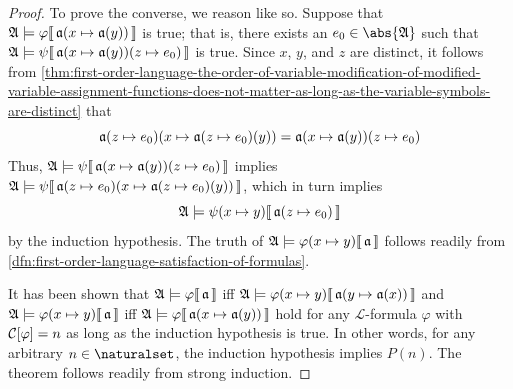 \begin{proof}
    \vspace{0.3cm}
    \noindent
    To prove the converse, we reason like so.
    Suppose that
    \( \folwffsatisfaction{\mathfrak{A}}{\varphi}{ \folmodifiedvariableassignmentfunction{\mathfrak{a}}{x}{\mathfrak{a}(y)} } \) is true; that is,
    there exists an \( e_{0} \in \abs{\mathfrak{A}} \) such that
    \(
        \folwffsatisfaction{\mathfrak{A}}{\psi}{ \folmodifiedvariableassignmentfunction{ \folmodifiedvariableassignmentfunction{\mathfrak{a}}{x}{\mathfrak{a}(y)} }{z}{e_{0}} }
    \) is true.
    Since \( x \), \( y \), and \( z \) are distinct, it follows from
    \cref{thm:first-order-language-the-order-of-variable-modification-of-modified-variable-assignment-functions-does-not-matter-as-long-as-the-variable-symbols-are-distinct} that
    \begin{equation*}
        \folmodifiedvariableassignmentfunction{ \folmodifiedvariableassignmentfunction{\mathfrak{a}}{z}{e_{0}} }{x}{ \folmodifiedvariableassignmentfunction{\mathfrak{a}}{z}{e_{0}}(y) } =
        \folmodifiedvariableassignmentfunction{ \folmodifiedvariableassignmentfunction{\mathfrak{a}}{x}{\mathfrak{a}(y)} }{z}{e_{0}}
    \end{equation*}
    Thus, \(\folwffsatisfaction{\mathfrak{A}}{\psi}{ \folmodifiedvariableassignmentfunction{ \folmodifiedvariableassignmentfunction{\mathfrak{a}}{x}{\mathfrak{a}(y)} }{z}{e_{0}} }\) implies
    \( \folwffsatisfaction{\mathfrak{A}}{\psi}{ \folmodifiedvariableassignmentfunction{ \folmodifiedvariableassignmentfunction{\mathfrak{a}}{z}{e_{0}} }{x}{ \folmodifiedvariableassignmentfunction{\mathfrak{a}}{z}{e_{0}}(y) } } \), which in turn implies
    \begin{equation*}
        \folwffsatisfaction{\mathfrak{A}}{ \folfreevariablereplacement{\psi}{x}{y} }{ \folmodifiedvariableassignmentfunction{\mathfrak{a}}{z}{e_{0}} }
    \end{equation*}
    by the induction hypothesis.
    The truth of \( \folwffsatisfaction{\mathfrak{A}}{ \folfreevariablereplacement{\varphi}{x}{y} }{ \mathfrak{a} } \) follows readily from \cref{dfn:first-order-language-satisfaction-of-formulas}.

    \vspace{0.3cm}
    \noindent
    It has been shown that \(  \mathfrak{A} \models \varphi\llbracket\, \mathfrak{a} \,\rrbracket \)
    iff \( \folwffsatisfaction{\mathfrak{A}}{ \folfreevariablereplacement{\varphi}{x}{y} }{ \folmodifiedvariableassignmentfunction{\mathfrak{a}}{y}{ \mathfrak{a}(x) } }\)
    and \( \folwffsatisfaction{\mathfrak{A}}{ \folfreevariablereplacement{\varphi}{x}{y} }{\mathfrak{a}} \)
    iff \( \folwffsatisfaction{\mathfrak{A}}{\varphi}{ \folmodifiedvariableassignmentfunction{\mathfrak{a}}{x}{ \mathfrak{a}(y)} } \)
    hold for any \( \mathcal{L} \)-formula \( \varphi \) with \( \folcomplexityofformula{\varphi} = n \) as long as the induction hypothesis is true.
    In other words, for any arbitrary \( n \in \naturalset \), the induction hypothesis implies \( P(n) \).
    The theorem follows readily from strong induction.
\end{proof}

